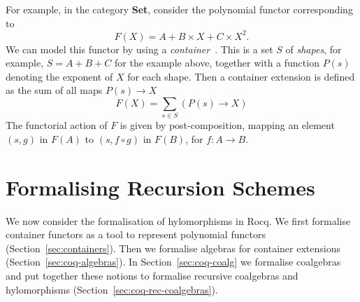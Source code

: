 \documentclass[a4paper,UKenglish,cleveref, autoref, thm-restate]{lipics-v2021}
\newcommand{\Type}{\mathbf{Type}}
\newcommand{\vcomp}{\circ}
\begin{document}
For example, in the category \textbf{Set}, consider the polynomial functor
corresponding to
\[
F(X) = A + B \times X + C \times X^2.
\]
We can model this functor by using a \emph{container}~\cite{AbbottAG05}. This is a set $S$
of \emph{shapes}, for example, $S = A + B + C$ for the example above, together with a function $P(s)$ denoting the exponent of $X$ for each shape.
Then a container extension is defined as the sum of all maps
$P(s) \to X$
\[
F(X) = \sum_{s \in S} (P(s) \to X)
\]
The functorial action
of $F$ is given by post-composition, mapping an element \( (s, g) \) in
\( F(A) \) to \( (s, f \vcomp g ) \) in \( F(B) \), for $f : A \to B$.




\section{Formalising Recursion Schemes}
\label{sec:recursion-schemes}
We now consider the formalisation of hylomorphisms in Rocq. We first formalise
container functors as a tool to represent polynomial functors
(Section~\ref{sec:containers}). Then we formalise algebras for container
extensions (Section~\ref{sec:coq-algebras}). In
Section~\ref{sec:coq-coalg} we formalise coalgebras and put together these notions to
formalise recursive coalgebras and hylomorphisms
(Section~\ref{sec:coq-rec-coalgebras}).
\end{document}
